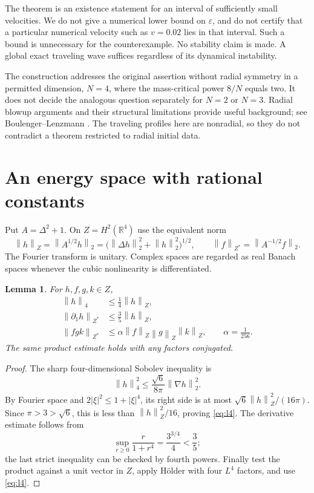 \documentclass[11pt,a4paper]{article}
\newtheorem{lemma}[theorem]{Lemma}
\theoremstyle{definition}\newtheorem{definition}[theorem]{Definition}
\theoremstyle{remark}\newtheorem{remark}[theorem]{Remark}
\newcommand{\R}{\mathbb R}
\newcommand{\norm}[1]{\left\|#1\right\|}
\begin{document}
The theorem is an existence statement for an interval of sufficiently small velocities. We do not give a numerical lower bound on \(\varepsilon\), and do not certify that a particular numerical velocity such as \(v=0.02\) lies in that interval. Such a bound is unnecessary for the counterexample. No stability claim is made. A global exact traveling wave suffices regardless of its dynamical instability.

The construction addresses the original assertion without radial symmetry in a permitted dimension, \(N=4\), where the mass-critical power \(8/N\) equals two. It does not decide the analogous question separately for \(N=2\) or \(N=3\). Radial blowup arguments and their structural limitations provide useful background; see Boulenger--Lenzmann \cite{BL}. The traveling profiles here are nonradial, so they do not contradict a theorem restricted to radial initial data.

\section{An energy space with rational constants}

Put \(A=\Delta^2+1\). On \(Z=H^2(\R^4)\) use the equivalent norm
\begin{equation}\label{eq:znorm}
 \norm h_Z=\norm{A^{1/2}h}_2
 =\bigl(\norm{\Delta h}_2^2+\norm h_2^2\bigr)^{1/2},
 \qquad \norm f_{Z^*}=\norm{A^{-1/2}f}_2.
\end{equation}
The Fourier transform is unitary. Complex spaces are regarded as real Banach spaces whenever the cubic nonlinearity is differentiated.

\begin{lemma}\label{lem:sobolev}
For \(h,f,g,k\in Z\),
\begin{align}
 \norm h_4&\le\tfrac14\norm h_Z,\label{eq:l4}\\
 \norm{\partial_1h}_{Z^*}&\le\tfrac35\norm h_Z,\label{eq:derivative}\\
 \norm{f g k}_{Z^*}&\le\alpha\norm f_Z\norm g_Z\norm k_Z,
 \qquad\alpha=\tfrac1{256}.\label{eq:trilinear}
\end{align}
The same product estimate holds with any factors conjugated.
\end{lemma}
\begin{proof}
The sharp four-dimensional Sobolev inequality \cite{Talenti} is
\[
 \norm h_4^2\le\frac{\sqrt6}{8\pi}\norm{\nabla h}_2^2.
\]
By Fourier space and \(2|\xi|^2\le1+|\xi|^4\), its right side is at most
\(\sqrt6\norm h_Z^2/(16\pi)\). Since \(\pi>3>\sqrt6\), this is less than \(\norm h_Z^2/16\), proving \eqref{eq:l4}. The derivative estimate follows from
\[
 \sup_{r\ge0}\frac{r}{1+r^4}=\frac{3^{3/4}}4<\frac35;
\]
the last strict inequality can be checked by fourth powers. Finally test the product against a unit vector in \(Z\), apply H\"older with four \(L^4\) factors, and use \eqref{eq:l4}.
\end{proof}
\end{document}
